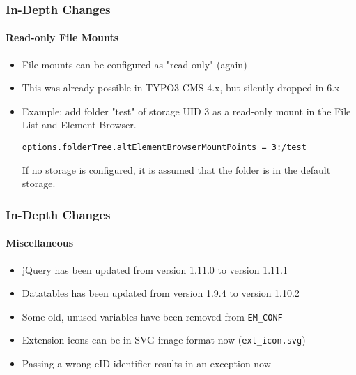 
\begin{frame}[fragile]
	\frametitle{In-Depth Changes}
	\framesubtitle{Read-only File Mounts}

	\begin{itemize}

		\item File mounts can be configured as "read only" (again)
		\item This was already possible in TYPO3 CMS 4.x, but silently dropped in 6.x
		\item Example: add folder "test" of storage UID 3 as a read-only mount in the File List and Element Browser.\newline

			\smaller\texttt{options.folderTree.altElementBrowserMountPoints = 3:/test}\normalsize\newline

			If no storage is configured, it is assumed that the folder is in the default storage.
	\end{itemize}

\end{frame}


\begin{frame}[fragile]
	\frametitle{In-Depth Changes}
	\framesubtitle{Miscellaneous}

	\begin{itemize}
		\item jQuery has been updated from version 1.11.0 to version 1.11.1
		\item Datatables has been updated from version 1.9.4 to version 1.10.2
		\item Some old, unused variables have been removed from \texttt{EM\_CONF}
		\item Extension icons can be in SVG image format now (\texttt{ext\_icon.svg})
		\item Passing a wrong eID identifier results in an exception now
	\end{itemize}

\end{frame}

